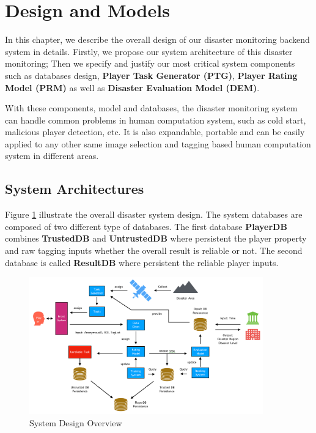 \section{Design and Models}
\label{chapter:design}

In this chapter, we describe the overall design of our disaster monitoring backend system in details.
Firstly, we propose our system architecture of this disaster monitoring;
Then we specify and justify our most critical system components such as databases design, 
\textbf{Player Task Generator (PTG)\label{idx:ptg}}, \textbf{Player Rating Model (PRM)\label{idx:prm}} 
as well as \textbf{Disaster Evaluation Model (DEM)\label{idx:dem}}.

With these components, model and databases, the disaster monitoring system can handle
common problems in human computation system, such as cold start, malicious player detection, etc. 
It is also expandable, portable and can be easily applied to any other same image selection 
and tagging based human computation system in different areas.

\subsection{System Architectures}

Figure \ref{fig:arch} illustrate the overall disaster system design.
The system databases are composed of two different type of databases. 
The first database \textbf{PlayerDB} combines \textbf{TrustedDB} and \textbf{UntrustedDB} 
where persistent the player property and raw tagging inputs whether the overall result is reliable or not.
The second database is called \textbf{ResultDB} where persistent the reliable player inputs.

\begin{figure}[htp]
\centering
\includegraphics[width=0.9\textwidth]{figures/system2}
\caption{System Design Overview}
\label{fig:arch}
\end{figure}

